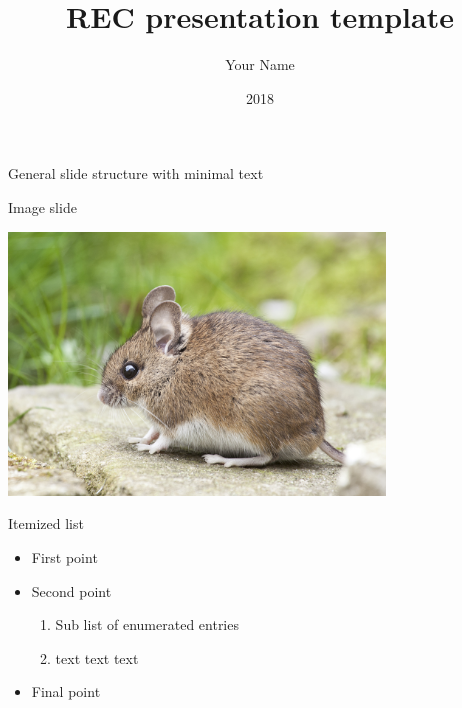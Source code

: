 \documentclass[12pt]{beamer}
\title{\Large REC presentation template}
\author{Your Name}
\date{2018}
\begin{document}
\maketitle



\begin{frame}

	\begin{flushright}
	\Large \textcolor{boss2}{General slide structure with minimal text} 
	\end{flushright}
\end{frame}




\begin{frame}

  \textcolor{recRed}{Image slide} \\
	\begin{center}
    \includegraphics[width=0.75\textwidth]{figs/mouse.jpeg}
	\end{center}
\end{frame}





\begin{frame}

\textcolor{recRed}{Itemized list} \\
\begin{itemize}
  \item First point
  \item Second point
    \begin{enumerate}
      \item Sub list of enumerated entries 
      \item text text text
    \end{enumerate}
  \item Final point
\end{itemize}
\end{frame}
\end{document}

